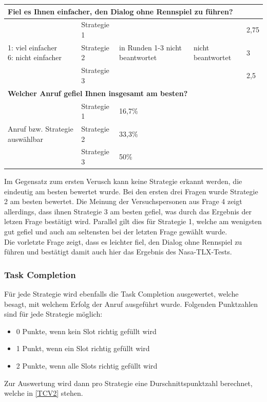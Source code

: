 \documentclass[12pt,a4paper]{scrartcl}
\begin{document}
\begin{longtable}{|p{4cm}|p{2cm}|p{2cm}|p{2cm}|p{2cm}|}
\hline
		\multicolumn{5}{l}{\textbf{Fiel es Ihnen einfacher, den Dialog ohne Rennspiel zu führen?}}\\
		\hline
\multirow{3}{4cm}{1: viel einfacher \newline  6: nicht einfacher} & Strategie 1 & \multirow{3}{2,5cm}{in Runden 1-3 nicht beantwortet} & \multirow{3}{2,5cm}{nicht beantwortet} & 2,75 \\
 & Strategie 2 & & & 3 \\
 & Strategie 3 & & & 2,5\\
\hline
		\multicolumn{5}{l}{\textbf{Welcher Anruf gefiel Ihnen insgesamt am besten?}}\\
		\hline
\multirow{3}{4cm}{Anruf bzw. Strategie auswählbar} & Strategie 1 & 16,7\% & & \\
 & Strategie 2 & 33,3\% && \\
 & Strategie 3 & 50\% && \\
\hline
\end{longtable}

Im Gegensatz zum ersten Verusch kann keine Strategie erkannt werden, die eindeutig am besten bewertet wurde. Bei den ersten drei Fragen wurde Strategie 2 am besten bewertet. Die Meinung der Versuchspersonen aus Frage 4 zeigt allerdings, dass ihnen Strategie 3 am besten gefiel, was durch das Ergebnis der letzen Frage bestätigt wird. Parallel gilt dies für Strategie 1, welche am wenigsten gut gefiel und auch am seltensten bei der letzten Frage gewählt wurde. \\

Die vorletzte Frage zeigt, dass es leichter fiel, den Dialog ohne Rennspiel zu führen und bestätigt damit auch hier das Ergebnis des Nasa-TLX-Tests.

\subsubsection{Task Completion}
Für jede Strategie wird ebenfalls die Task Completion ausgewertet, welche besagt, mit welchem Erfolg der Anruf ausgeführt wurde. Folgenden Punktzahlen sind für jede Strategie möglich:
\begin{itemize}
\item 0 Punkte, wenn kein Slot richtig gefüllt wird
\item 1 Punkt, wenn ein Slot richtig gefüllt wird
\item 2 Punkte, wenn alle Slots richtig gefüllt wird
\end{itemize}
Zur Auswertung wird dann pro Strategie eine Durschnittspunktzahl berechnet, welche in \ref{TCV2} stehen. 
\end{document}

